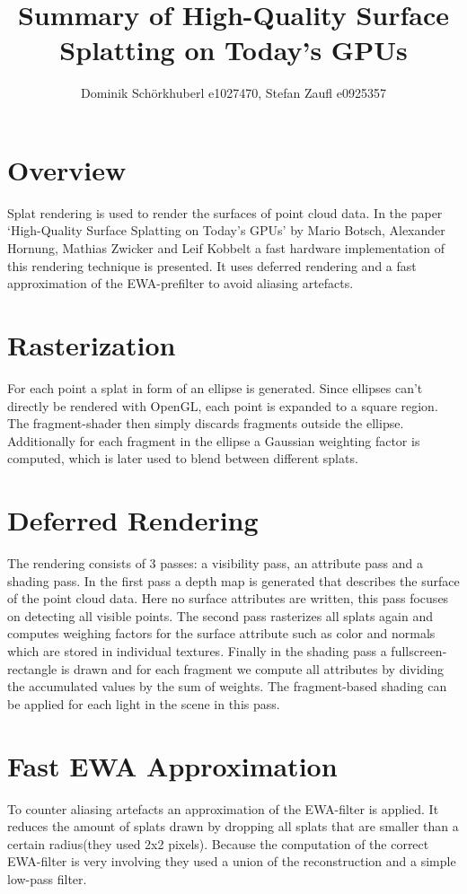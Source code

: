 \documentclass[12pt,a4paper]{article}
\title{Summary of High-Quality Surface Splatting on Today’s GPUs}
\author{Dominik Schörkhuberl e1027470, Stefan Zaufl e0925357}
\begin{document}
\maketitle

\section{Overview}
Splat rendering is used to render the surfaces of point cloud data. In the paper `High-Quality Surface Splatting on Today’s GPUs' by Mario Botsch, Alexander Hornung, Mathias Zwicker and Leif Kobbelt a fast hardware implementation of this rendering technique is  presented. It uses deferred rendering and a fast approximation of the EWA-prefilter to avoid aliasing artefacts.

\section{Rasterization}
For each point a splat in form of an ellipse is generated. Since ellipses can't directly be rendered with OpenGL, each point is expanded to a square region. The fragment-shader then simply discards fragments outside the ellipse. Additionally for each fragment in the ellipse a Gaussian weighting factor is computed, which is later used to blend between different splats. 

\section{Deferred Rendering}
The rendering consists of 3 passes: a visibility pass, an attribute pass and a shading pass. In the first pass a depth map is generated that describes the surface of the point cloud data. Here no surface attributes are written, this pass focuses on detecting all visible points. The second pass rasterizes all splats again and computes weighing factors for the surface attribute such as color and normals which are stored in individual textures. Finally in the shading pass a fullscreen-rectangle is drawn and for each fragment we compute all attributes by dividing the accumulated values by the sum of weights. The fragment-based shading can be applied for each light in the scene in this pass.

\section{Fast EWA Approximation}
To counter aliasing artefacts an approximation of the EWA-filter is applied. It reduces the amount of splats drawn by dropping all splats that are smaller than a certain radius(they used 2x2 pixels). Because the computation of the correct EWA-filter is very involving they used a union of the reconstruction and a simple low-pass filter.
\end{document}
